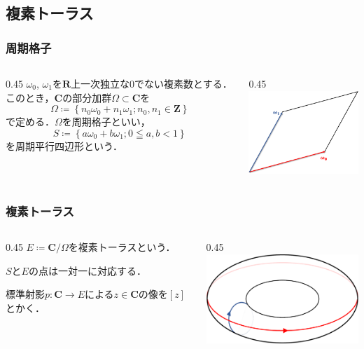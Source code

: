 \documentclass[dvipdfmx,12pt,aspectratio=169]{beamer}%
\newcommand{\zz}{\mathbf{Z}}
\newcommand{\rr}{\mathbf{R}}
\newcommand{\cc}{\mathbf{C}}
\begin{document}
\subsection{複素トーラス}

\begin{frame}
    \frametitle{周期格子}
    \begin{columns}
        \begin{column}{0.45\hsize}
            $\omega_0$, $\omega_1$を$\rr$上一次独立な$0$でない複素数とする．
            このとき，$\cc$の部分加群$\Omega\subset\cc$を
            \begin{equation*}
                \Omega\coloneqq\left\{n_0\omega_0+n_1\omega_1;n_0,n_1\in\zz\right\}
            \end{equation*}
            で定める．$\Omega$を周期格子といい，
            \begin{equation*}
                S\coloneqq\left\{a\omega_0+b\omega_1;0\leqq a,b <1\right\}
            \end{equation*}
            を周期平行四辺形という．
        \end{column}
        \begin{column}{0.45\hsize}
            \includegraphics[width=6cm]{fig/lattice.pdf}
            \centering
        \end{column}
    \end{columns}
\end{frame}

\begin{frame}
    \frametitle{複素トーラス}
    \begin{columns}
        \begin{column}{0.45\hsize}
            $E\coloneqq \cc/\Omega$を複素トーラスという．

            $S$と$E$の点は一対一に対応する．

            標準射影$p\colon \cc\to E$による$z\in\cc$の像を$[z]$とかく．
        \end{column}
        \begin{column}{0.45\hsize}
            \includegraphics[width=6cm]{fig/torus.pdf}
            \centering
        \end{column}
    \end{columns}
\end{frame}
\end{document}
